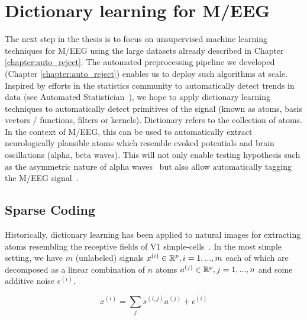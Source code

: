 \chapter{Dictionary learning for M/EEG}

The next step in the thesis is to focus on unsupervised machine learning techniques for M/EEG using the large datasets already described in Chapter \ref{chapter:auto_reject}. The automated preprocessing pipeline we developed (Chapter \ref{chapter:auto_reject}) enables us to deploy such algorithms at scale. Inspired by efforts in the statistics community to automatically detect trends in data (see Automated Statistician~\citep{ghahramani2015probabilistic}), we hope to apply dictionary learning techniques to automatically detect primitives of the signal (known as atoms, basis vectors / functions, filters or kernels). Dictionary refers to the collection of atoms. In the context of M/EEG, this can be used to automatically extract neurologically plausible atoms which resemble evoked potentials and brain oscillations (alpha, beta waves). This will not only enable testing hypothesis such as the asymmetric nature of alpha waves~\citep{mazaheri2008asymmetric} but also allow automatically tagging the M/EEG  signal~\citep{bigdely2013hierarchical}. 

\section{Sparse Coding}
Historically, dictionary learning has been applied to natural images for extracting atoms resembling the receptive fields of V1 simple-cells~\citep{olshausen1997sparse}. In the most simple setting, we have $m$ (unlabeled) signals $x^{(i)} \in \mathbb{R}^{p}, i=1, ..., m$ each of which are decomposed as a linear combination of $n$ atoms $a^{(j)} \in \mathbb{R}^{p}, j=1, ..., n$ and some additive noise $\epsilon^{(i)}$.

\begin{equation}
   x^{(i)} = \sum_{j} s^{(i, j)} a^{(j)}  + \epsilon^{(i)}
\end{equation}

